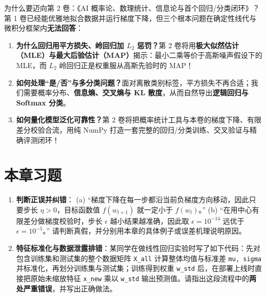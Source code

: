\begin{insightBox}{为什么要迈向第 2 卷：《AI 概率论、数理统计、信息论与首个回归/分类闭环》？}
第 1 卷已经能优雅地拟合数据并运行梯度下降，但三个根本问题在确定性线代与微积分框架内\textbf{无法回答}：
\begin{enumerate}
  \item \textbf{为什么回归用平方损失、岭回归加 $L_2$ 惩罚？}第 2 卷将用\textbf{极大似然估计（MLE）与最大后验估计（MAP）}揭示：最小二乘等价于高斯噪声假设下的 MLE，而 $L_2$ 岭回归正是权重服从高斯先验时的 MAP！
  \item \textbf{如何处理“是/否”与多分类问题？}面对离散类别标签，平方损失不再合适；我们需要概率分布、\textbf{信息熵、交叉熵与 KL 散度}，从而自然导出\textbf{逻辑回归与 Softmax 分类}。
  \item \textbf{如何量化模型泛化可靠性？}第 2 卷将把概率统计工具与本卷的梯度下降、有限差分校验合流，用纯 NumPy 打造一套完整的回归/分类训练、交叉验证与精确评测闭环！
\end{enumerate}
\end{insightBox}

\section{本章习题}
\label{sec:ch6-exercises}

\begin{enumerate}[label=\textbf{6.\arabic*}]
  \item \textbf{判断正误并纠错}：
  (a) “梯度下降在每一步都沿当前负梯度方向移动，因此只要步长 $\eta > 0$，目标函数值 $f(w_{t+1})$ 就一定小于 $f(w_t)$。”
  (b) “在用中心有限差分做梯度校验时，步长 $\epsilon$ 越小结果越准确，因此取 $\epsilon = 10^{-14}$ 远优于 $\epsilon = 10^{-5}$。”
  请判断真假，并分别用本章的具体例子或误差机理说明原因。

  \item \textbf{特征标准化与数据泄露排错}：某同学在做线性回归实验时写了如下代码：先对包含训练集和测试集的整个数据矩阵 \texttt{X\_all} 计算整体均值与标准差 \texttt{mu, sigma} 并标准化，再划分训练集与测试集；训练得到权重 \texttt{w\_std} 后，在部署上线时直接把原始未缩放特征 \texttt{x\_new} 乘以 \texttt{w\_std} 输出预测值。请指出这段流程中的\textbf{两处严重错误}，并写出正确做法。
\end{enumerate}

